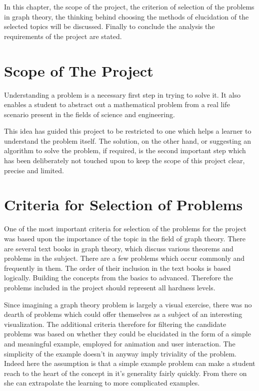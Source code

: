 In this chapter, the scope of the project, the criterion of selection of the
problems in graph theory, the thinking behind choosing the methods of
elucidation of the selected topics will be discussed. Finally to conclude the analysis
the requirements of the project are stated.


\section{Scope of The Project}

Understanding a problem is a necessary first step in trying to solve it.
It also enables a student to abstract out a mathematical
problem from a real life scenario present in the fields of science and engineering.

This idea has guided this project to be restricted to one which helps a learner to
understand the problem itself. The solution, on the other hand, or suggesting an
algorithm to solve the problem, if required, is the second important step which
has been deliberately not touched upon to keep the scope of this project
clear, precise and limited.


\section{Criteria for Selection of Problems}
\label{section: selectionCriteria}
One of the most important criteria for selection of the problems for the project was
based upon the importance of the topic in the field of graph theory. There are
several text books in graph theory, which discuss various theorems and problems in
the subject.  There are a few problems which occur commonly and frequently in
them. The order of their inclusion in the text books is based logically.
Building the concepts from the basics to advanced. Therefore the problems
included in the project should represent all hardness levels.

Since imagining a graph theory problem is largely a visual exercise, there
was no dearth of problems which could offer themselves as a subject of an
interesting visualization. The additional criteria therefore for filtering the
candidate problems was based on whether they could be elucidated in the form of a
simple and meaningful example, employed for animation and user
interaction. The simplicity of the example doesn't in anyway imply
triviality of the problem. Indeed here the assumption is that a simple example
problem can make a student reach to the heart of the concept in it's generality
fairly quickly. From there on she can extrapolate the learning to more
complicated examples.

